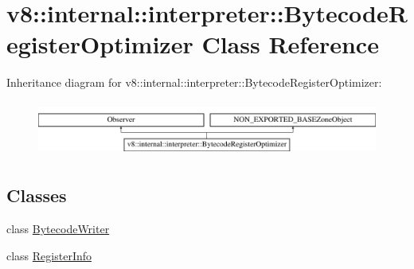 \hypertarget{classv8_1_1internal_1_1interpreter_1_1BytecodeRegisterOptimizer}{}\section{v8\+:\+:internal\+:\+:interpreter\+:\+:Bytecode\+Register\+Optimizer Class Reference}
\label{classv8_1_1internal_1_1interpreter_1_1BytecodeRegisterOptimizer}
Inheritance diagram for v8\+:\+:internal\+:\+:interpreter\+:\+:Bytecode\+Register\+Optimizer\+:\begin{figure}[H]
\begin{center}
\leavevmode
\includegraphics[height=1.836066cm]{classv8_1_1internal_1_1interpreter_1_1BytecodeRegisterOptimizer}
\end{center}
\end{figure}
\subsection*{Classes}
\begin{DoxyCompactItemize}
\item 
class \mbox{\hyperlink{classv8_1_1internal_1_1interpreter_1_1BytecodeRegisterOptimizer_1_1BytecodeWriter}{Bytecode\+Writer}}
\item 
class \mbox{\hyperlink{classv8_1_1internal_1_1interpreter_1_1BytecodeRegisterOptimizer_1_1RegisterInfo}{Register\+Info}}
\end{DoxyCompactItemize}
